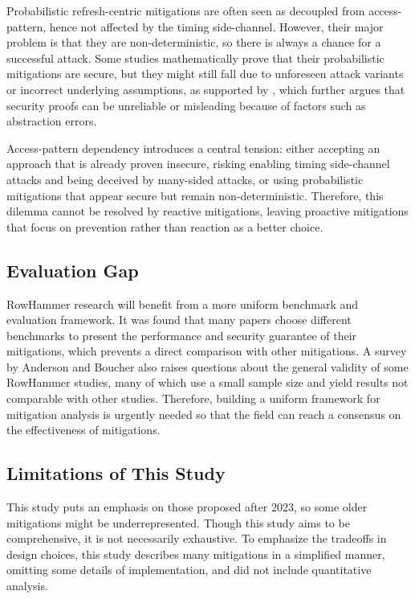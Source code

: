 \documentclass[journal,twocolumn]{IEEEtran}
\begin{document}
Probabilistic refresh-centric mitigations are often seen as decoupled from access-pattern, hence not affected by the timing side-channel. However, their major problem is that they are non-deterministic, so there is always a chance for a successful attack. Some studies mathematically prove that their probabilistic mitigations are secure, but they might still fall due to unforeseen attack variants or incorrect underlying assumptions, as supported by \cite{Anderson23}, which further argues that security proofs can be unreliable or misleading because of factors such as abstraction errors.

Access-pattern dependency introduces a central tension: either accepting an approach that is already proven insecure, risking enabling timing side-channel attacks and being deceived by many-sided attacks, or using probabilistic mitigations that appear secure but remain non-deterministic. Therefore, this dilemma cannot be resolved by reactive mitigations, leaving proactive mitigations that focus on prevention rather than reaction as a better choice.

\subsection{Evaluation Gap}

RowHammer research will benefit from a more uniform benchmark and evaluation framework. It was found that many papers choose different benchmarks to present the performance and security guarantee of their mitigations, which prevents a direct comparison with other mitigations. A survey by Anderson and Boucher\cite{Heckel26_2} also raises questions about the general validity of some RowHammer studies, many of which use a small sample size and yield results not comparable with other studies. Therefore, building a uniform framework for mitigation analysis is urgently needed so that the field can reach a consensus on the effectiveness of mitigations.

\subsection{Limitations of This Study}

This study puts an emphasis on those proposed after 2023, so some older mitigations might be underrepresented.  Though this study aims to be comprehensive, it is not necessarily exhaustive. To emphasize the tradeoffs in design choices, this study describes many mitigations in a simplified manner, omitting some details of implementation, and did not include quantitative analysis.
\end{document}
